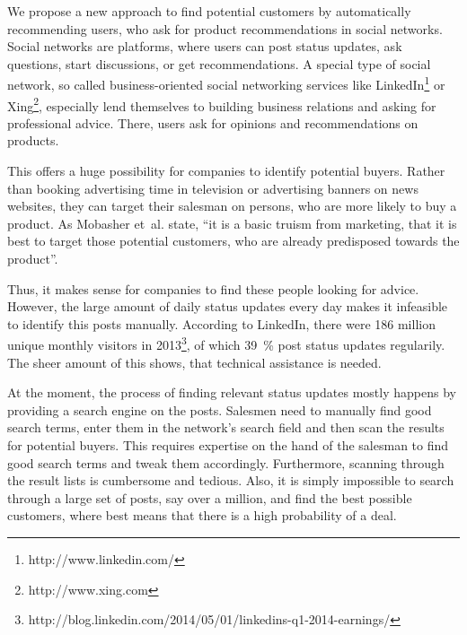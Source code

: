 We propose a new approach to find potential customers by automatically recommending users, who ask for product recommendations in social networks.
Social networks are platforms, where users can post status updates, ask questions, start discussions, or get recommendations.
A special type of social network, so called business-oriented social networking services like LinkedIn\footnote{http://www.linkedin.com/} or Xing\footnote{http://www.xing.com}, especially lend themselves to building business relations and asking for professional advice.
There, users ask for opinions and recommendations on products.

This offers a huge possibility for companies to identify potential buyers.
Rather than booking advertising time in television or advertising banners on news websites, they can target their salesman on persons, who are more likely to buy a product.
As Mobasher et~al. \cite{mobasher2007toward} state, ``it is a basic truism from marketing, that it is best to target those potential customers, who are already predisposed towards the product''.

Thus, it makes sense for companies to find these people looking for advice.
However, the large amount of daily status updates every day makes it infeasible to identify this posts manually.
According to LinkedIn, there were 186 million unique monthly visitors in 2013\footnote{http://blog.linkedin.com/2014/05/01/linkedins-q1-2014-earnings/}, of which 39~\% post status updates regularily.
The sheer amount of this shows, that technical assistance is needed.

At the moment, the process of finding relevant status updates mostly happens by providing a search engine on the posts.
Salesmen need to manually find good search terms, enter them in the network's search field and then scan the results for potential buyers.
This requires expertise on the hand of the salesman to find good search terms and tweak them accordingly.
Furthermore, scanning through the result lists is cumbersome and tedious.
Also, it is simply impossible to search through a large set of posts, say over a million, and find the best possible customers, where best means that there is a high probability of a deal.

